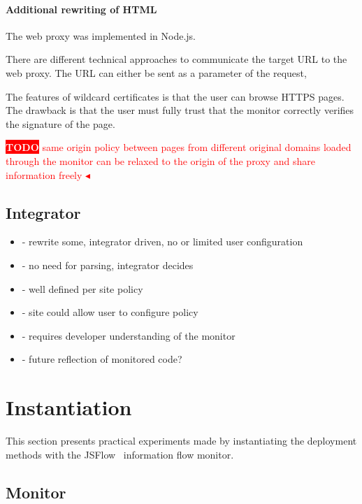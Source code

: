 \documentclass{llncs}
\newcommand{\todo}[1]{\colorbox{red}{\textcolor{white}{\sffamily\bfseries\scriptsize TODO}} \textcolor{red}{#1} \textcolor{red}{$\blacktriangleleft$}}
\begin{document}
\paragraph{Additional rewriting of HTML}


The web proxy was implemented in Node.js. 

There are different technical approaches to communicate the target URL to the web 
proxy. The URL can either be sent as a parameter of the request, 

The features of wildcard certificates is that the user can browse HTTPS pages. The drawback is that the user must fully trust that the monitor correctly verifies the signature of the page.

\todo{same origin policy between pages from different original domains loaded through the monitor can be relaxed to the origin of the proxy and share information freely}



\subsection{Integrator}

\begin{itemize}
\item- rewrite some, integrator driven, no or limited user configuration
\item- no need for parsing, integrator decides
\item- well defined per site policy
\item- site could allow user to configure policy
\item- requires developer understanding of the monitor
\item- future reflection of monitored code?
\end{itemize}


\section{Instantiation}
\label{sec:case}

This section presents practical experiments made by instantiating the deployment
methods with the JSFlow~\cite{JSFlow} information flow monitor. 

\subsection{Monitor}
\end{document}
